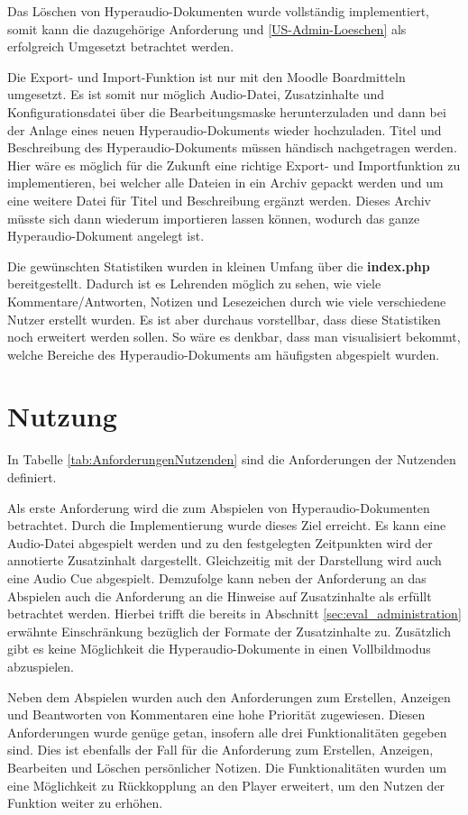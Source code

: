 Das Löschen von Hyperaudio-Dokumenten wurde vollständig implementiert, somit kann die dazugehörige Anforderung und \ref{US-Admin-Loeschen} als erfolgreich Umgesetzt betrachtet werden.

Die Export- und Import-Funktion ist nur mit den Moodle Boardmitteln umgesetzt. Es ist somit nur möglich Audio-Datei, Zusatzinhalte und Konfigurationsdatei über die Bearbeitungsmaske herunterzuladen und dann bei der Anlage eines neuen Hyperaudio-Dokuments wieder hochzuladen. Titel und Beschreibung des Hyperaudio-Dokuments müssen händisch nachgetragen werden. Hier wäre es möglich für die Zukunft eine richtige Export- und Importfunktion zu implementieren, bei welcher alle Dateien in ein Archiv gepackt werden und um eine weitere Datei für Titel und Beschreibung ergänzt werden. Dieses Archiv müsste sich dann wiederum importieren lassen können, wodurch das ganze Hyperaudio-Dokument angelegt ist.

Die gewünschten Statistiken wurden in kleinen Umfang über die \textbf{index.php} bereitgestellt. Dadurch ist es Lehrenden möglich zu sehen, wie viele Kommentare/Antworten, Notizen und Lesezeichen durch wie viele verschiedene Nutzer erstellt wurden. Es ist aber durchaus vorstellbar, dass diese Statistiken noch erweitert werden sollen. So wäre es denkbar, dass man visualisiert bekommt, welche Bereiche des Hyperaudio-Dokuments am häufigsten abgespielt wurden.

 
\section{Nutzung}
In Tabelle \ref{tab:AnforderungenNutzenden} sind die Anforderungen der Nutzenden definiert.

Als erste Anforderung wird die zum Abspielen von Hyperaudio-Dokumenten betrachtet. Durch die Implementierung wurde dieses Ziel erreicht. Es kann eine Audio-Datei abgespielt werden und zu den festgelegten Zeitpunkten wird der annotierte Zusatzinhalt dargestellt. Gleichzeitig mit der Darstellung wird auch eine Audio Cue abgespielt. Demzufolge kann neben der Anforderung an das Abspielen auch die Anforderung an die Hinweise auf Zusatzinhalte als erfüllt betrachtet werden. Hierbei trifft die bereits in Abschnitt \ref{sec:eval_administration} erwähnte Einschränkung bezüglich der Formate der Zusatzinhalte zu. Zusätzlich gibt es keine Möglichkeit die Hyperaudio-Dokumente in einen Vollbildmodus abzuspielen.


Neben dem Abspielen wurden auch den Anforderungen zum Erstellen, Anzeigen und Beantworten von Kommentaren eine hohe Priorität zugewiesen. Diesen Anforderungen wurde genüge getan, insofern alle drei Funktionalitäten gegeben sind. Dies ist ebenfalls der Fall für die Anforderung zum Erstellen, Anzeigen, Bearbeiten und Löschen persönlicher Notizen. Die Funktionalitäten wurden um eine Möglichkeit zu Rückkopplung an den Player erweitert, um den Nutzen der Funktion weiter zu erhöhen. 

